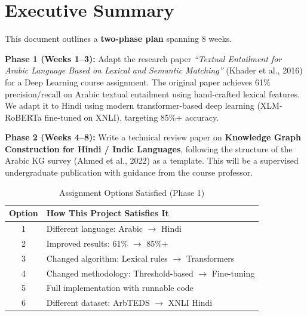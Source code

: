 \section{Executive Summary}

This document outlines a \textbf{two-phase plan} spanning 8 weeks.

\textbf{Phase 1 (Weeks 1--3):} Adapt the research paper \textit{``Textual Entailment for Arabic Language Based on Lexical and Semantic Matching''} (Khader et al., 2016) for a Deep Learning course assignment. The original paper achieves 61\% precision/recall on Arabic textual entailment using hand-crafted lexical features. We adapt it to Hindi using modern transformer-based deep learning (XLM-RoBERTa fine-tuned on XNLI), targeting 85\%+ accuracy.

\textbf{Phase 2 (Weeks 4--8):} Write a technical review paper on \textbf{Knowledge Graph Construction for Hindi / Indic Languages}, following the structure of the Arabic KG survey (Ahmed et al., 2022) as a template. This will be a supervised undergraduate publication with guidance from the course professor.

\begin{table}[h]
\centering
\caption{Assignment Options Satisfied (Phase 1)}
\begin{tabularx}{\textwidth}{cX}
\toprule
\textbf{Option} & \textbf{How This Project Satisfies It} \\
\midrule
1 & Different language: Arabic $\rightarrow$ Hindi \\
2 & Improved results: 61\% $\rightarrow$ 85\%+ \\
3 & Changed algorithm: Lexical rules $\rightarrow$ Transformers \\
4 & Changed methodology: Threshold-based $\rightarrow$ Fine-tuning \\
5 & Full implementation with runnable code \\
6 & Different dataset: ArbTEDS $\rightarrow$ XNLI Hindi \\
\bottomrule
\end{tabularx}
\end{table}
